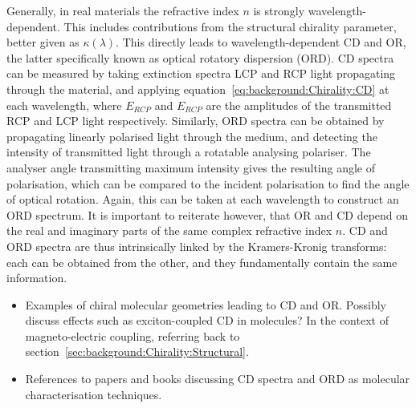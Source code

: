 Generally, in real materials the refractive index $n$ is strongly wavelength-dependent. This includes contributions from the structural chirality parameter, better given as $\kappa(\lambda)$. This directly leads to wavelength-dependent CD and OR, the latter specifically known as optical rotatory dispersion (ORD). CD spectra can be measured by taking extinction spectra LCP and RCP light propagating through the material, and applying equation~\ref{eq:background:Chirality:CD} at each wavelength, where $E_{RCP}$ and $E_{RCP}$ are the amplitudes of the transmitted RCP and LCP light respectively. Similarly, ORD spectra can be obtained by propagating linearly polarised light through the medium, and detecting the intensity of transmitted light through a rotatable analysing polariser. The analyser angle transmitting maximum intensity gives the resulting angle of polarisation, which can be compared to the incident polarisation to find the angle of optical rotation. Again, this can be taken at each wavelength to construct an ORD spectrum. It is important to reiterate however, that OR and CD depend on the real and imaginary parts of the same complex refractive index $n$. CD and ORD spectra are thus intrinsically linked by the Kramers-Kronig transforms: each can be obtained from the other, and they fundamentally contain the same information. 

\begin{itemize}
    \item Examples of chiral molecular geometries leading to CD and OR. Possibly discuss effects such as exciton-coupled CD in molecules? In the context of magneto-electric coupling, referring back to section~\ref{sec:background:Chirality:Structural}.
    \item References to papers and books discussing CD spectra and ORD as molecular characterisation techniques.
\end{itemize}



